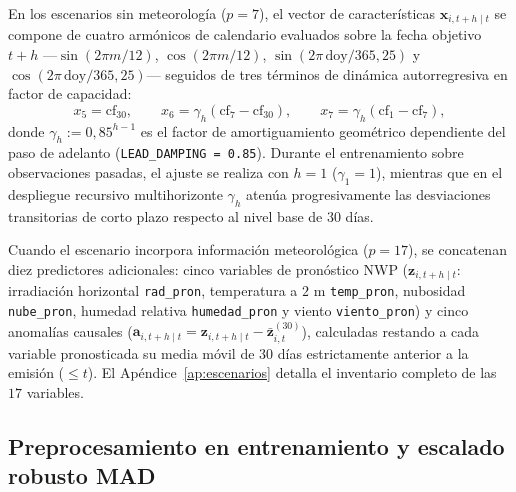 En los escenarios sin meteorología ($p = 7$), el vector de características $\mathbf{x}_{i,t+h \mid t}$ se compone de cuatro armónicos de calendario evaluados sobre la fecha objetivo $t+h$ ---$\sin(2\pi m/12)$, $\cos(2\pi m/12)$, $\sin(2\pi\,\mathrm{doy}/365{,}25)$ y $\cos(2\pi\,\mathrm{doy}/365{,}25)$--- seguidos de tres términos de dinámica autorregresiva en factor de capacidad:
\begin{equation}
x_5 = \mathrm{cf}_{30},\qquad
x_6 = \gamma_h (\mathrm{cf}_{7} - \mathrm{cf}_{30}),\qquad
x_7 = \gamma_h (\mathrm{cf}_{1} - \mathrm{cf}_{7}),
\label{eq:features_din}
\end{equation}
donde $\gamma_h := 0{,}85^{h-1}$ es el factor de amortiguamiento geométrico dependiente del paso de adelanto (\texttt{LEAD\_DAMPING = 0.85}). Durante el entrenamiento sobre observaciones pasadas, el ajuste se realiza con $h=1$ ($\gamma_1 = 1$), mientras que en el despliegue recursivo multihorizonte $\gamma_h$ atenúa progresivamente las desviaciones transitorias de corto plazo respecto al nivel base de $30$ días.

Cuando el escenario incorpora información meteorológica ($p = 17$), se concatenan diez predictores adicionales: cinco variables de pronóstico NWP ($\mathbf{z}_{i,t+h \mid t}$: irradiación horizontal \texttt{rad\_pron}, temperatura a $2\text{ m}$ \texttt{temp\_pron}, nubosidad \texttt{nube\_pron}, humedad relativa \texttt{humedad\_pron} y viento \texttt{viento\_pron}) y cinco anomalías causales ($\mathbf{a}_{i,t+h \mid t} = \mathbf{z}_{i,t+h \mid t} - \bar{\mathbf{z}}^{(30)}_{i,t}$), calculadas restando a cada variable pronosticada su media móvil de $30$ días estrictamente anterior a la emisión ($\le t$). El Apéndice~\ref{ap:escenarios} detalla el inventario completo de las $17$ variables.

\subsection{Preprocesamiento en entrenamiento y escalado robusto MAD}

